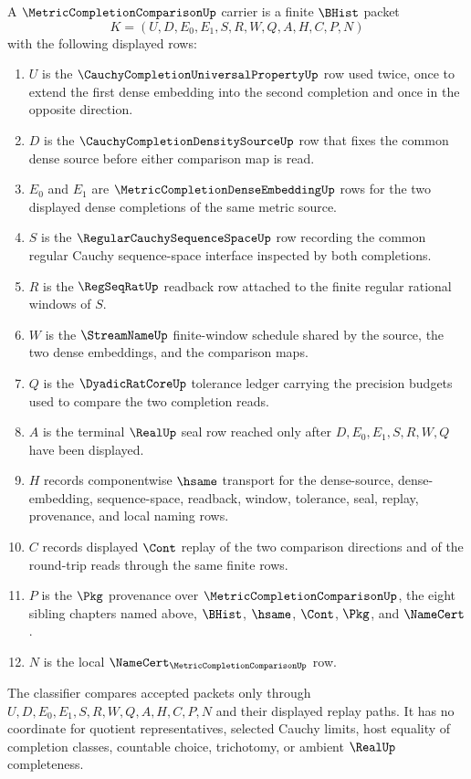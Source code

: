 \begin{definition}
\label{def:metric-completion-comparison-carrier}
A $\MetricCompletionComparisonUp$ carrier is a finite $\BHist$ packet
$$
K=(U,D,E_0,E_1,S,R,W,Q,A,H,C,P,N)
$$
with the following displayed rows:
\begin{enumerate}
\item $U$ is the $\CauchyCompletionUniversalPropertyUp$ row used twice, once to extend the first dense embedding into the second completion and once in the opposite direction.
\item $D$ is the $\CauchyCompletionDensitySourceUp$ row that fixes the common dense source before either comparison map is read.
\item $E_0$ and $E_1$ are $\MetricCompletionDenseEmbeddingUp$ rows for the two displayed dense completions of the same metric source.
\item $S$ is the $\RegularCauchySequenceSpaceUp$ row recording the common regular Cauchy sequence-space interface inspected by both completions.
\item $R$ is the $\RegSeqRatUp$ readback row attached to the finite regular rational windows of $S$.
\item $W$ is the $\StreamNameUp$ finite-window schedule shared by the source, the two dense embeddings, and the comparison maps.
\item $Q$ is the $\DyadicRatCoreUp$ tolerance ledger carrying the precision budgets used to compare the two completion reads.
\item $A$ is the terminal $\RealUp$ seal row reached only after $D,E_0,E_1,S,R,W,Q$ have been displayed.
\item $H$ records componentwise $\hsame$ transport for the dense-source, dense-embedding, sequence-space, readback, window, tolerance, seal, replay, provenance, and local naming rows.
\item $C$ records displayed $\Cont$ replay of the two comparison directions and of the round-trip reads through the same finite rows.
\item $P$ is the $\Pkg$ provenance over $\MetricCompletionComparisonUp$, the eight sibling chapters named above, $\BHist$, $\hsame$, $\Cont$, $\Pkg$, and $\NameCert$.
\item $N$ is the local $\NameCert_{\MetricCompletionComparisonUp}$ row.
\end{enumerate}
The classifier compares accepted packets only through $U,D,E_0,E_1,S,R,W,Q,A,H,C,P,N$ and their displayed replay paths. It has no coordinate for quotient representatives, selected Cauchy limits, host equality of completion classes, countable choice, trichotomy, or ambient $\RealUp$ completeness.
\end{definition}

